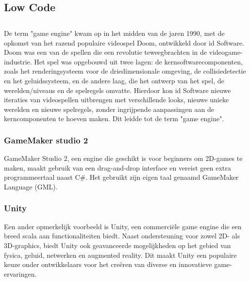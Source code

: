 \chapter{}%
\label{ch:stand-van-zaken}


\section{Low Code}


\section{}%
\label{sec:game-engines}
De term "game engine" kwam op in het midden van de jaren 1990, met de opkomst van het razend populaire videospel Doom, ontwikkeld door id Software. Doom was een van de spellen die een revolutie teweegbrachten in de videogame-industrie. Het spel was opgebouwd uit twee lagen: de kernsoftwarecomponenten, zoals het renderingsysteem voor de driedimensionale omgeving, de collisiedetectie en het geluidssysteem, en de andere laag, die het ontwerp van het spel, de werelden/niveaus en de spelregels omvatte. Hierdoor kon id Software nieuwe iteraties van videospellen uitbrengen met verschillende looks, nieuwe unieke werelden en nieuwe spelregels, zonder ingrijpende aanpassingen aan de kerncomponenten te hoeven maken. Dit leidde tot de term "game engine". \cite{gregory2018game}

\subsection{GameMaker studio 2}
GameMaker Studio 2, een engine die geschikt is voor beginners om 2D-games te maken, maakt gebruik van een drag-and-drop interface en vereist geen extra programmeertaal naast C\#. Het gebruikt zijn eigen taal genaamd GameMaker Language (GML). \autocite{cossu2019game}

\subsection{Unity}
Een ander opmerkelijk voorbeeld is Unity, een commerciële game engine die een breed scala aan functionaliteiten biedt. Naast ondersteuning voor zowel 2D- als 3D-graphics, biedt Unity ook geavanceerde mogelijkheden op het gebied van fysica, geluid, netwerken en augmented reality. Dit maakt Unity een populaire keuze onder ontwikkelaars voor het creëren van diverse en innovatieve game-ervaringen. \autocite{Haas2014}

